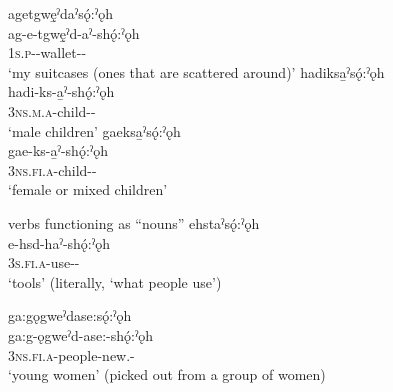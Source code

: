 \ex agetgwę̱ˀdaˀsǫ́:ˀǫh\\
\gll ag-e-tgwę̱ˀd-aˀ-shǫ́:ˀǫh\\
 \textsc{1s.p}-{\joinerE}-wallet-{\nsf}-{\pluralizer}\\
\glt `my suitcases (ones that are scattered around)'
\ex hadiksa̱ˀsǫ́:ˀǫh\\
\gll hadi-ks-a̱ˀ-shǫ́:ˀǫh\\
 \textsc{3ns.m.a}-child-{\nsf}-{\pluralizer}\\
\glt `male children'
\ex gaeksa̱ˀsǫ́:ˀǫh\\
\gll gae-ks-a̱ˀ-shǫ́:ˀǫh\\
 \textsc{3ns.fi.a}-child-{\nsf}-{\pluralizer}\\
\glt `female or mixed children'
\z
\z

\ea\label{ex:sooex3} verbs functioning as “nouns”
\ea ehstaˀsǫ́:ˀǫh\\
\gll e-hsd-haˀ-shǫ́:ˀǫh\\
\textsc{3s.fi.a}-use-{\habitual}-{\pluralizer}\\
\glt ‘tools’ (literally, `what people use’)


\ex ga:gǫgweˀdase:sǫ́:ˀǫh\\
\gll ga:g-ǫgweˀd-ase:-shǫ́:ˀǫh\\
\textsc{3ns.fi.a}-people-new.{\stat}-{\pluralizer}\\
\glt ‘young women’ (picked out from a group of women)

